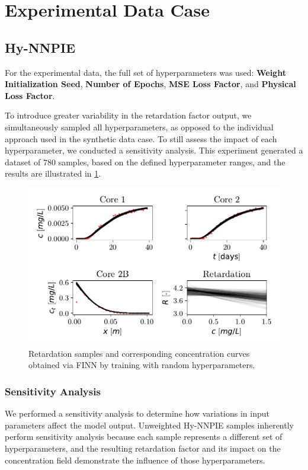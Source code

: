 \section{Experimental Data Case}

\subsection{Hy-NNPIE}
For the experimental data, the full set of hyperparameters was used: \textbf{Weight Initialization Seed}, \textbf{Number of Epochs}, \textbf{MSE Loss Factor}, and \textbf{Physical Loss Factor}.

To introduce greater variability in the retardation factor output, we simultaneously sampled all hyperparameters, as opposed to the individual approach used in the synthetic data case. To still assess the impact of each hyperparameter, we conducted a sensitivity analysis. This experiment generated a dataset of $780$ samples, based on the defined hyperparameter ranges, and the results are illustrated in \cref{fig:span_samples}.

\begin{figure}[h]
    \centering
    \includegraphics{figs/finn_span_samples.pdf}
    \caption{Retardation samples and corresponding concentration curves obtained via FINN by training with random hyperparameters.}
    \label{fig:span_samples}
\end{figure}



\subsubsection{Sensitivity Analysis}
\label{sec:sensitivity}
We performed a sensitivity analysis to determine how variations in input parameters affect the model output. Unweighted Hy-NNPIE samples inherently perform sensitivity analysis because each sample represents a different set of hyperparameters, and the resulting retardation factor and its impact on the concentration field demonstrate the influence of those hyperparameters.

